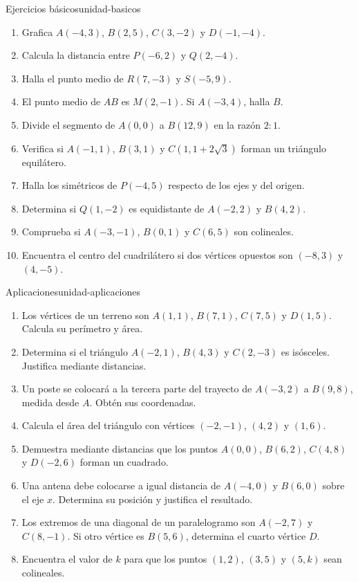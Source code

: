 \begin{exercise}{Ejercicios básicos}{unidad-basicos}
\begin{enumerate}
  \item Grafica $A(-4,3)$, $B(2,5)$, $C(3,-2)$ y $D(-1,-4)$.
  \item Calcula la distancia entre $P(-6,2)$ y $Q(2,-4)$.
  \item Halla el punto medio de $R(7,-3)$ y $S(-5,9)$.
  \item El punto medio de $AB$ es $M(2,-1)$. Si $A(-3,4)$, halla $B$.
  \item Divide el segmento de $A(0,0)$ a $B(12,9)$ en la razón $2:1$.
  \item Verifica si $A(-1,1)$, $B(3,1)$ y $C(1,1+2\sqrt3)$ forman un
  triángulo equilátero.
  \item Halla los simétricos de $P(-4,5)$ respecto de los ejes y del origen.
  \item Determina si $Q(1,-2)$ es equidistante de $A(-2,2)$ y $B(4,2)$.
  \item Comprueba si $A(-3,-1)$, $B(0,1)$ y $C(6,5)$ son colineales.
  \item Encuentra el centro del cuadrilátero si dos vértices opuestos son
  $(-8,3)$ y $(4,-5)$.
\end{enumerate}
\end{exercise}

\begin{problem}{Aplicaciones}{unidad-aplicaciones}
\begin{enumerate}
  \item Los vértices de un terreno son $A(1,1)$, $B(7,1)$, $C(7,5)$ y
  $D(1,5)$. Calcula su perímetro y área.
  \item Determina si el triángulo $A(-2,1)$, $B(4,3)$ y $C(2,-3)$ es
  isósceles. Justifica mediante distancias.
  \item Un poste se colocará a la tercera parte del trayecto de $A(-3,2)$ a
  $B(9,8)$, medida desde $A$. Obtén sus coordenadas.
  \item Calcula el área del triángulo con vértices $(-2,-1)$, $(4,2)$ y
  $(1,6)$.
  \item Demuestra mediante distancias que los puntos $A(0,0)$, $B(6,2)$,
  $C(4,8)$ y $D(-2,6)$ forman un cuadrado.
  \item Una antena debe colocarse a igual distancia de $A(-4,0)$ y $B(6,0)$
  sobre el eje $x$. Determina su posición y justifica el resultado.
  \item Los extremos de una diagonal de un paralelogramo son $A(-2,7)$ y
  $C(8,-1)$. Si otro vértice es $B(5,6)$, determina el cuarto vértice $D$.
  \item Encuentra el valor de $k$ para que los puntos $(1,2)$, $(3,5)$ y
  $(5,k)$ sean colineales.
\end{enumerate}
\end{problem}

